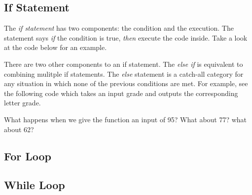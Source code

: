 \documentclass[paper=a4, fontsize=11pt]{scrartcl} %
\numberwithin{equation}{section} %
\numberwithin{figure}{section} %
\numberwithin{table}{section} %
\begin{document}
\subsection{If Statement}
The \textit{if statement} has two components: the condition and the execution.
The statement says \textit{if} the condition is true, \textit{then} execute the code inside. Take a look at the code below for an example. 


There are two other components to an if statement. 
The \textit{else if} is equivalent to combining mulitple if statements. 
The \textit{else} statement is a catch-all category for any situation in which none of the previous conditions are met.
For example, see the following code which takes an input grade and outputs the corresponding letter grade.

What happens when we give the function an input of 95? What about 77? what about 62?

\subsection{For Loop}

\subsection{While Loop}
\end{document}
